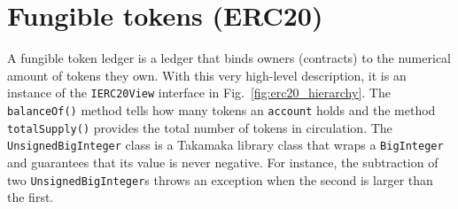 \section{Fungible tokens (ERC20)}\label{sec:erc20}

A fungible token ledger is a ledger that binds owners (contracts) to
the numerical amount of tokens they own. With this very high-level description,
it is an instance of the \texttt{IERC20View} interface in Fig.~\ref{fig:erc20_hierarchy}.
The \texttt{balanceOf()} method tells how many tokens an \texttt{account} holds and the method
\texttt{totalSupply()} provides the total number of tokens in circulation.
The \texttt{UnsignedBigInteger}
class is a Takamaka library class that wraps a \texttt{BigInteger}
and guarantees that its value is never negative. For instance, the subtraction of two
\texttt{UnsignedBigInteger}s throws an exception when the second is larger than the first.

